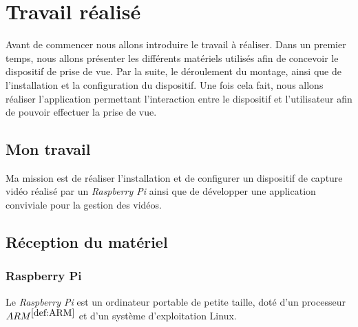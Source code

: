 \chapter{Travail réalisé}
\minitoc %
    \label{Chapitre 4}
    Avant de commencer nous allons introduire le travail à réaliser. Dans un premier temps, nous allons présenter les différents matériels utilisés afin de concevoir le dispositif de prise de vue. Par la suite, le déroulement du montage, ainsi que de l'installation et la configuration du dispositif. Une fois cela fait, nous allons réaliser l'application permettant l'interaction entre le dispositif et l'utilisateur afin de pouvoir effectuer la prise de vue.
    
    \section{Mon travail}
        Ma mission est de réaliser l'installation et de configurer un dispositif de capture vidéo réalisé par un \textit{Raspberry Pi} ainsi que de développer une application conviviale pour la gestion des vidéos.
 
    \section{Réception du matériel}
        \subsection{Raspberry Pi}
        Le \textit{Raspberry Pi} est un ordinateur portable de petite taille, doté d'un processeur \underline{$ ARM^{\ref{def:ARM}}$}  et d'un système d'exploitation Linux.



        \vspace{0.2cm}

